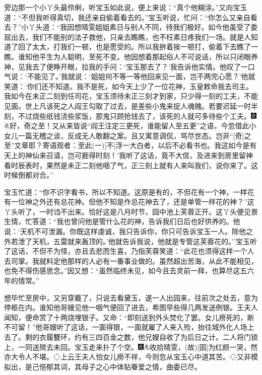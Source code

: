 旁边那一个小丫头最伶俐，听宝玉如此说，便上来说：``真个他糊涂。''又向宝玉道：``不但我听得真切，我还亲自偷着看去的。''宝玉听说，忙问：``你怎么又亲自看去？''小丫头道：``我因想晴雯姐姐素日与别人不同，待我们极好。如今他虽受了委屈出去，我们不能别的法子救他，只亲去瞧瞧，也不枉素日疼我们一场。就是人知道了回了太太，打我们一顿，也是愿受的。所以我拚着挨一顿打，偷着下去瞧了一瞧。谁知他平生为人聪明，至死不变。他因想着那起俗人不可说话，所以只闭眼养神，见我去了便睁开眼，拉我的手问：`宝玉那去了？'我告诉他实情。他叹了一口气说：`不能见了。'我就说：`姐姐何不等一等他回来见一面，岂不两完心愿？'他就笑道：`你们还不知道。我不是死，如今天上少了一位花神，玉皇敕命我去司主。我如今在未正二刻到任司花，宝玉须待未正三刻才到家，只少得一刻的工夫，不能见面。世上凡该死之人阎王勾取了过去，是差些小鬼来捉人魂魄。若要迟延一时半刻，不过烧些纸钱浇些浆饭，那鬼只顾抢钱去了，该死的人就可多待些个工夫。{\includegraphics[width=3mm]{../Images/00004}\includegraphics[width=3mm]{../Images/00012}\footnotesize \kaishu 好，奇之至！又从来皆说``阎王注定三更死，谁能留人至五更''之语，今忽借此小女儿一篇无稽之谈，反成无人敢翻之案。且又寓意调侃，骂尽世态。岂非``{[}奇{]}之至''文章耶？寄语观者：至此{(一)}{[}不{]}浮一大白者，以后不必看书也。}我这如今是有天上的神仙来召请，岂可捱得时刻！'我听了这话，竟不大信，及进来到房里留神看时辰表时，果然是未正二刻他咽了气，正三刻上就有人来叫我们，说你来了。这时候倒都对合。''

宝玉忙道：``你不识字看书，所以不知道。这原是有的，不但花有一个神，一样花有一位神之外还有总花神。但他不知是作总花神去了，还是单管一样花的神？''这丫头听了，一时诌不出来。恰好这是八月时节，园中池上芙蓉正开。这丫头便见景生情，忙答道：``我也曾问他是管什么花的神，告诉我们日后也好供养的。他说：`天机不可泄漏。你既这样虔诚，我只告诉你，你只可告诉宝玉一人。除他之外若泄了天机，五雷就来轰顶的。'他就告诉我说，他就是专管这芙蓉花的。''宝玉听了这话，不但不为怪，亦且去悲而生喜，乃指芙蓉笑道：``此花也须得这样一个人去司掌。我就料定他那样的人必有一番事业做的。虽然超出苦海，从此不能相见，也免不得伤感思念。''因又想：``虽然临终未见，如今且去灵前一拜，也算尽这五六年的情常。''

想毕忙至房中，又另穿戴了，只说去看黛玉，遂一人出园来，往前次之处去，意为停柩在内。谁知他哥嫂见他一咽气便回了进去，希图早些得几两发送例银。王夫人闻知，便命赏了十两烧埋银子。又命：``即刻送到外头焚化了罢。女儿痨死的，断不可留！''他哥嫂听了这话，一面得银，一面就雇了人来入殓，抬往城外化人场上去了。剩的衣履簪环，约有三四百金之数，他兄嫂自收了为后日之计。二人将门锁上，一同送殡去未回。宝玉走来扑了个空。{\includegraphics[width=3mm]{../Images/00004}\includegraphics[width=3mm]{../Images/00012}\footnotesize \kaishu 收拾晴雯，{(故)}{[}固{]}为红颜一哭，然亦大令人不堪。◇上云王夫人怕女儿痨不祥，今则忽从宝玉心中道其苦。◇又非模拟出，是己悒郁其词，其母子之心中体贴眷爱之情，曲委已尽。}

